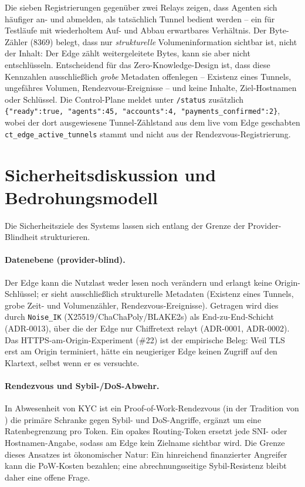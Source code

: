 Die sieben Registrierungen gegenüber zwei Relays zeigen, dass Agenten sich
häufiger an- und abmelden, als tatsächlich Tunnel bedient werden -- ein für
Testläufe mit wiederholtem Auf- und Abbau erwartbares Verhältnis. Der
Byte-Zähler (8369) belegt, dass nur \emph{strukturelle} Volumeninformation
sichtbar ist, nicht der Inhalt: Der Edge zählt weitergeleitete Bytes, kann sie
aber nicht entschlüsseln. Entscheidend für das Zero-Knowledge-Design ist, dass
diese Kennzahlen ausschließlich \emph{grobe} Metadaten offenlegen -- Existenz
eines Tunnels, ungefähres Volumen, Rendezvous-Ereignisse -- und keine Inhalte,
Ziel-Hostnamen oder Schlüssel. Die Control-Plane meldet unter \texttt{/status}
zusätzlich \texttt{\{"ready":true, "agents":45, "accounts":4,
"payments\_confirmed":2\}}, wobei der dort ausgewiesene Tunnel-Zählstand aus dem
live vom Edge geschabten \texttt{ct\_edge\_active\_tunnels} stammt und nicht aus
der Rendezvous-Registrierung.

\section{Sicherheitsdiskussion und Bedrohungsmodell}
\label{sec:sicherheit}

Die Sicherheitsziele des Systems lassen sich entlang der Grenze der
Provider-Blindheit strukturieren.

\paragraph{Datenebene (provider-blind).} Der Edge kann die Nutzlast weder lesen
noch verändern und erlangt keine Origin-Schlüssel; er sieht ausschließlich
strukturelle Metadaten (Existenz eines Tunnels, grobe Zeit- und Volumenzähler,
Rendezvous-Ereignisse). Getragen wird dies durch \texttt{Noise\_IK}
(X25519/ChaChaPoly/BLAKE2s) als End-zu-End-Schicht (ADR-0013), über die der
Edge nur Chiffretext relayt (ADR-0001, ADR-0002). Das HTTPS-am-Origin-Experiment
(\#22) ist der empirische Beleg: Weil TLS erst am Origin terminiert, hätte ein
neugieriger Edge keinen Zugriff auf den Klartext, selbst wenn er es versuchte.

\paragraph{Rendezvous und Sybil-/DoS-Abwehr.} In Abwesenheit von KYC ist ein
Proof-of-Work-Rendezvous (in der Tradition von \cite{back2002hashcash}) die
primäre Schranke gegen Sybil- und DoS-Angriffe, ergänzt um eine
Ratenbegrenzung pro Token. Ein opakes Routing-Token ersetzt jede SNI- oder
Hostnamen-Angabe, sodass am Edge kein Zielname sichtbar wird. Die Grenze dieses
Ansatzes ist ökonomischer Natur: Ein hinreichend finanzierter Angreifer kann die
PoW-Kosten bezahlen; eine abrechnungsseitige Sybil-Resistenz bleibt daher eine
offene Frage.

